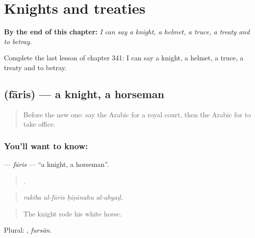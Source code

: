 
\chapter{Knights and treaties}
\label{ch:ar-knights-and-treaties}

\begin{chapteropening}
\textbf{By the end of this chapter:} \emph{I can say a knight, a helmet, a truce, a treaty and to betray.}

Complete the last lesson of chapter 341: I can say a knight, a helmet, a truce, a treaty and to betray.
\end{chapteropening}

\section[\texorpdfstring{\ar{فارس} (fāris)}{فارس (fāris)}]{ (fāris) — a knight, a horseman}

\label{lesson:AR-C341-faris}



\begin{quote}
Before the new one: say the Arabic for a royal court, then the Arabic for to take office.
\end{quote}

\subsection*{You'll want to know: }
\textbf{} — \emph{fāris} — \textquotedblleft{}a knight, a horseman\textquotedblright{}.

\begin{quote}
   .
\end{quote}

\begin{quote}
\emph{rakiba al-fāris ḥiṣānahu al-abyaḍ.}
\end{quote}

\begin{quote}
The knight rode his white horse.
\end{quote}

Plural: , \emph{fursān}.


